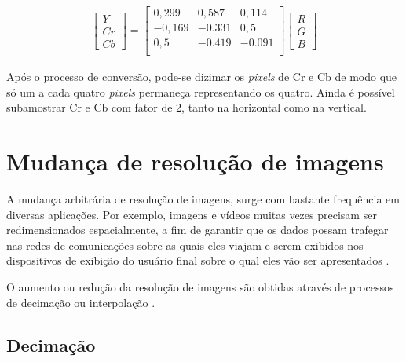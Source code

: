 \begin{center}
	\begin{equation}
	\begin{split}
	\begin{bmatrix}		
	Y\\ Cr \\ Cb
	\end{bmatrix}
	 = 
	\begin{bmatrix}
  		0,299 & 0,587 &  0,114 \\
  		-0,169 &-0.331 & 0,5 \\
  		0,5  & -0.419  & -0.091\\
	\end{bmatrix}
	\begin{bmatrix}
	R\\ G \\ B
	\end{bmatrix}
	\label{rgb2yuv} 
	\end{split}
	\end{equation}

\end{center}

\noindent Após o processo de conversão, pode-se dizimar os \textit{pixels} de Cr e Cb de modo que só um a cada quatro \textit{pixels} permaneça representando os quatro. Ainda é possível subamostrar Cr e Cb com fator de 2, tanto na horizontal como na vertical.


\section{Mudança de resolução de imagens}



A mudança arbitrária de resolução de imagens, surge com bastante frequência em diversas aplicações. Por exemplo, imagens e vídeos muitas vezes precisam ser redimensionados espacialmente, a fim de garantir que os dados possam trafegar nas redes de comunicações sobre as quais eles viajam e serem exibidos nos dispositivos de exibição do usuário final sobre o qual eles vão ser apresentados \cite{salazar2007complexity}.

O aumento ou redução da resolução de imagens são obtidas através de processos de decimação ou interpolação \cite{diniz2010digital}. 

\subsection{Decimação}

